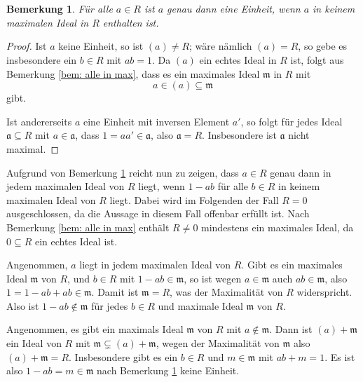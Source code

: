 \documentclass[a4paper,10pt]{article}
\newcounter{satze}
\newtheorem{bem}[satze]{Bemerkung}
\newcommand{\mf}[1]{\mathfrak{#1}}
\begin{document}
\section{}\label{sec: alternative definition J(R)}

\begin{bem}\label{bem: einheiten und maximale ideale}
 Für alle $a \in R$ ist $a$ genau dann eine Einheit, wenn $a$ in keinem maximalen Ideal in $R$ enthalten ist.
\end{bem}
\begin{proof}
 Ist $a$ keine Einheit, so ist $(a) \neq R$; wäre nämlich $(a) = R$, so gebe es insbesondere ein $b \in R$ mit $ab=1$. Da $(a)$ ein echtes Ideal in $R$ ist, folgt aus Bemerkung \ref{bem: alle in max}, dass es ein maximales Ideal $\mf{m}$ in $R$ mit
 \[
  a \in (a) \subseteq \mf{m}
 \]
 gibt.

 Ist andererseits $a$ eine Einheit mit inversen Element $a'$, so folgt für jedes Ideal $\mf{a} \subseteq R$ mit $a \in \mf{a}$, dass $1 = aa' \in \mf{a}$, also $\mf{a} = R$. Insbesondere ist $\mf{a}$ nicht maximal.
\end{proof}

Aufgrund von Bemerkung \ref{bem: einheiten und maximale ideale} reicht nun zu zeigen, dass $a \in R$ genau dann in jedem maximalen Ideal von $R$ liegt, wenn $1-ab$ für alle $b \in R$ in keinem maximalen Ideal von $R$ liegt. Dabei wird im Folgenden der Fall $R=0$ ausgeschlossen, da die Aussage in diesem Fall offenbar erfüllt ist. Nach Bemerkung \ref{bem: alle in max} enthält $R \neq 0$ mindestens ein maximales Ideal, da $0 \subseteq R$ ein echtes Ideal ist.

Angenommen, $a$ liegt in jedem maximalen Ideal von $R$. Gibt es ein maximales Ideal $\mf{m}$ von $R$, und $b \in R$ mit $1-ab \in \mf{m}$, so ist wegen $a \in \mf{m}$ auch $ab \in \mf{m}$, also $1 = 1-ab + ab \in \mf{m}$. Damit ist $\mf{m} = R$, was der Maximalität von $R$ widerspricht. Also ist $1-ab \not\in \mf{m}$ für jedes $b \in R$ und maximale Ideal $\mf{m}$ von $R$.

Angenommen, es gibt ein maximals Ideal $\mf{m}$ von $R$ mit $a \not\in \mf{m}$. Dann ist $(a) + \mf{m}$ ein Ideal von $R$ mit $\mf{m} \subsetneq (a) + \mf{m}$, wegen der Maximalität von $\mf{m}$ also $(a) + \mf{m} = R$. Insbesondere gibt es ein $b \in R$ und $m \in \mf{m}$ mit $ab+m = 1$. Es ist also $1-ab = m \in \mf{m}$ nach Bemerkung \ref{bem: einheiten und maximale ideale} keine Einheit.
\end{document}
